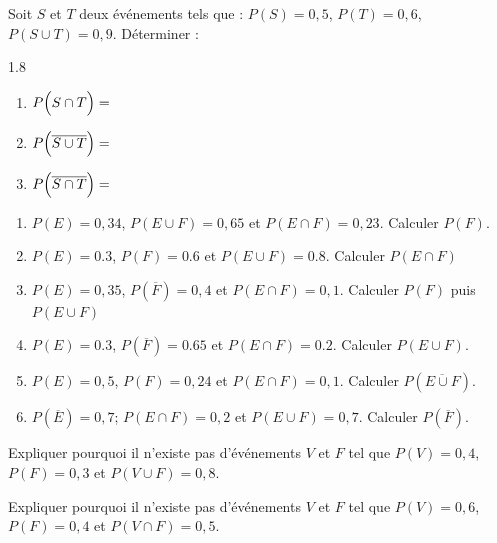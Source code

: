 \documentclass[main.tex]{subfiles}
\begin{document}
\begin{exercise} 	Soit $S$ et $T$ deux événements tels que : $P(S)=0,5$, $P(T)=0,6$, $P(S\cup T)=0,9$. Déterminer :\vspace{-0.5em}	  
\begin{spacing}{1.8}
	\begin{enumerate}[label={}, leftmargin=*] 
	\item $P\Big(S\cap T\Big)=\dotfill$ 
	\item $P\Big(\overline{S\cup T}\Big)=\dotfill$ 
	\item $P\Big(\overline{S\cap T}\Big)=\dotfill$
	\end{enumerate}
\end{spacing}  \vspace{-0.75em}	  
\end{exercise}
\begin{exercise}\hfill 
	\begin{enumerate}[label=\arabic*), leftmargin=*]
		\item $P(E)=0,34$, $P(E\cup F)=0,65$ et $P(E\cap F)=0,23$. Calculer $P(F)$.
		\item $P(E)=0.3$, $P(F)=0.6$ et $P(E\cup F)=0.8$. Calculer $P(E\cap F)$
		\item $P(E)=0,35$, $P(\overline{F})=0,4$ et $P(E\cap F)=0,1$. Calculer $P(F)$ puis $P(E\cup F)$ 
		\item $P(E)=0.3$, $P(\overline{F})=0.65$ et $P(E\cap F)=0.2$. Calculer $P(E\cup F)$.
		\item $P(E)=0,5$, $P(F)=0,24$ et $P(E\cap F)=0,1$. Calculer $P(\overline{E\cup F})$.
		\item $P(\overline{E})=0,7$; $P(E\cap F)=0,2$ et $P(E\cup F)=0,7$. Calculer $P(\overline{F})$.
	\end{enumerate} 
\end{exercise} 
\begin{exercise} Expliquer pourquoi il n'existe pas d'événements $V$ et $F$ tel que $P(V)=0,4$, $P(F)=0,3$ et $P(V\cup F)=0,8$. 
\end{exercise} 
\begin{exercise}Expliquer pourquoi il n'existe pas d'événements $V$ et $F$   tel que $P(V)=0,6$, $P(F)=0,4$ et $P(V\cap F)=0,5$. 
\end{exercise} 
\end{document}
